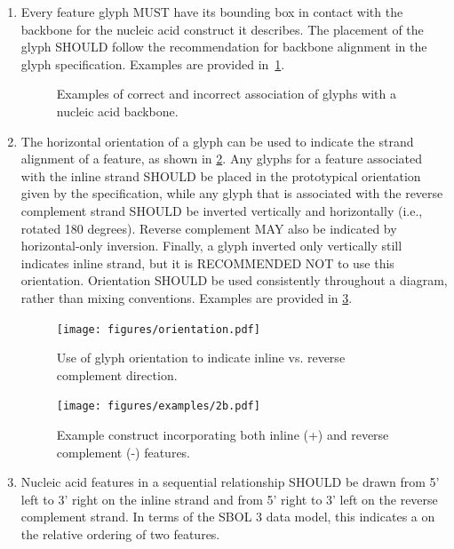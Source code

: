 \begin{enumerate}
\item Every feature glyph MUST have its bounding box in contact with the backbone for the nucleic acid construct it describes. 
The placement of the glyph SHOULD follow the recommendation for backbone alignment in the glyph specification.
	Examples are provided in~\ref{exa:2a}.
   	\begin{figure}[h!]
	\centering
	\caption{Examples of correct and incorrect association of glyphs with a nucleic acid backbone.}
	\label{exa:2a}
	\end{figure}

\item The horizontal orientation of a glyph can be used to indicate the strand alignment of a feature, as shown in \ref{f:orientation}. 
	Any glyphs for a feature associated with the inline strand SHOULD be placed in the prototypical orientation given by the specification,
	while any glyph that is associated with the reverse complement strand SHOULD be inverted vertically and horizontally (i.e., rotated 180 degrees). 
	Reverse complement MAY also be indicated by horizontal-only inversion.
	Finally, a glyph inverted only vertically still indicates inline strand, but it is RECOMMENDED NOT to use this orientation.
	Orientation SHOULD be used consistently throughout a diagram, rather than mixing conventions.
	Examples are provided in \ref{exa:2b}.
	
	\begin{figure}[h!]
	\centering
	\texttt{[image: figures/orientation.pdf]}
	\caption{Use of glyph orientation to indicate inline vs. reverse complement direction.}
	\label{f:orientation}
	\end{figure} 
	
	\begin{figure}[h!]
	\centering
	\texttt{[image: figures/examples/2b.pdf]}
	\caption{Example construct incorporating both inline (+) and reverse complement (-) features.}
	\label{exa:2b}
	\end{figure} 

\item Nucleic acid features in a sequential relationship SHOULD be drawn from 5' left to 3' right on the inline strand and from 5' right to 3' left on the reverse complement strand.
	In terms of the SBOL 3 data model, this indicates a  on the relative ordering of two features.


\end{enumerate}
